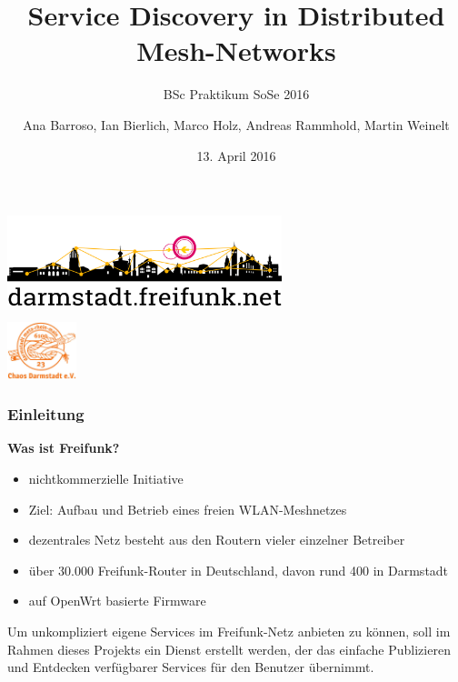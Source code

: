 \documentclass[accentcolor=tud6b,colorbacktitle,inverttitle,landscape,german,presentation,t]{tudbeamer}
\begin{document}
	
	\title[Service Discovery in Distributed Mesh-Networks]{Service Discovery in Distributed Mesh-Networks}
	\subtitle{BSc Praktikum SoSe 2016}
	
	\author{Ana Barroso, Ian Bierlich, Marco Holz, Andreas Rammhold, Martin Weinelt}


	\date{13. April 2016}
	
	\begin{titleframe}
		\begin{center}
			\vspace{1cm}
			\includegraphics[width=0.6\textwidth]{images/logo-skyline-text-below}
			\vspace{1.4cm}
		\end{center}
			\flushright
			\includegraphics[width=0.15\textwidth]{images/cda}
	\end{titleframe}
	
	\begin{frame}
		\frametitle{Einleitung}
		\vfill
		\textbf{Was ist Freifunk?}
		\vfill
		\begin{itemize}
			\item nichtkommerzielle Initiative
			\item Ziel: Aufbau und Betrieb eines freien WLAN-Meshnetzes
			\item dezentrales Netz besteht aus den Routern vieler einzelner Betreiber
			\item über 30.000 Freifunk-Router in Deutschland, davon rund 400 in Darmstadt
			\item auf OpenWrt basierte Firmware
		\end{itemize}
		\vfill
		\pause
		Um unkompliziert eigene Services im Freifunk-Netz anbieten zu können, soll im Rahmen dieses Projekts ein Dienst erstellt werden, der das einfache Publizieren und Entdecken verfügbarer Services für den Benutzer übernimmt.
	\end{frame}
\end{document}
